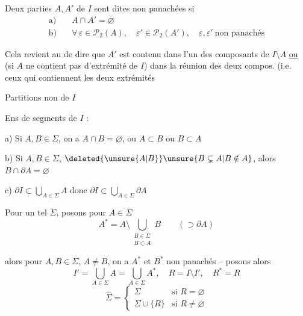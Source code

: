 Deux parties $A,A'$ de $I$ sont dites non panachées si \[\begin{aligned}\text{a)}\quad&A\cap A'=\varnothing\\ \text{b)}\quad&\forall\,\varepsilon\in\mathcal{P}_2(A),\quad\varepsilon'\in\mathcal{P}_2(A'),\quad \varepsilon,\varepsilon'\ \text{non panachés}\end{aligned}\]

\reversemarginpar{} Cela revient au \unsure{$=$} de dire que $A'$ est contenu dans l'un des  composants de $I\setminus A$ \uline{ou} (si $A$ ne contient pas d'extrémité de $I$) dans la réunion des deux compos.   (i.e. ceux qui contiennent  les deux extrémités

\normalmarginpar

Partitions non  de $I$

Ens \inserted{$\Sigma$} de segments de $I$  :

a) Si $A,B\in\Sigma$, on a $A\cap B=\varnothing$, ou $A\subset B$ ou $B\subset A$

b) Si $A,B\in\Sigma$, $\deleted{\unsure{A|B}}\unsure{B\subsetneq A|B\notin A}$, alors $B\cap\partial A=\varnothing$

c) \deleted{\unsure{$\forall$|$\forall\varepsilon$}} $\partial I\subset\bigcup\limits_{A\in\Sigma} A$ donc $\partial I\subset\bigcup\limits_{A\in\Sigma}\partial A$

Pour un tel $\Sigma$, posons pour $A\in\Sigma$ \[ A^{\ast}=A\setminus\bigcup_{\substack{B\in\Sigma\\B\subset A}} B \qquad (\supset\partial A) \] 

alors  pour $A,B\in\Sigma$, $A\ne B$, on a $A^{\ast}$ et $B^{\ast}$ non panachés -- posons  alors  \[ I'=\bigcup_{A\in\Sigma}A=\bigcup_{A\in\Sigma} A^{\ast},\quad R=I\setminus I',\quad R^{\ast}=R \] \[ \hat{\Sigma}=\begin{cases}\Sigma &\text{si }R=\varnothing\\ \Sigma\cup\{R\} &\text{si }R\ne\varnothing\end{cases} \]

